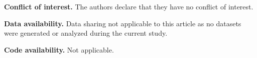 \documentclass[11pt,letterpaper]{article}
\numberwithin{equation}{section}
\theoremstyle{plain}
\theoremstyle{definition}
\theoremstyle{remark}
\begin{document}
\noindent\textbf{Conflict of interest.} The authors declare that they have no
conflict of interest.

\smallskip
\noindent\textbf{Data availability.} Data sharing not applicable to this
article as no datasets were generated or analyzed during the current study.

\smallskip
\noindent\textbf{Code availability.} Not applicable.



\end{document}
